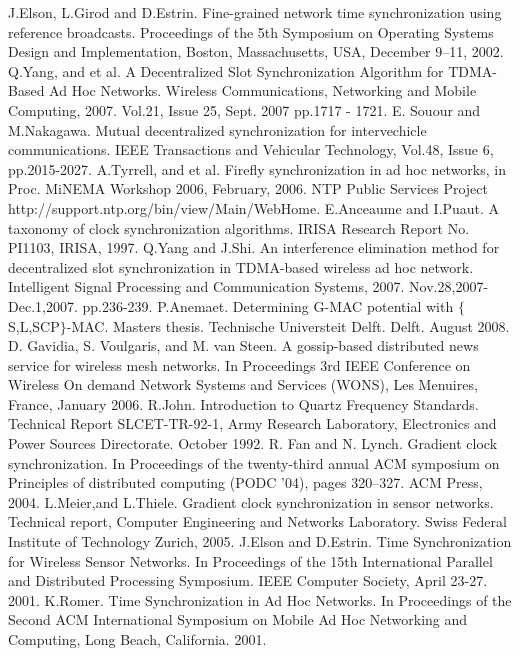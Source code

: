 \documentclass[a4paper,10pt]{report}
\begin{document}
\begin{thebibliography}{\textbf{References}}
J.Elson, L.Girod and D.Estrin. Fine-grained network time synchronization using reference broadcasts. Proceedings of the 5th Symposium on Operating Systems Design and Implementation, Boston, Massachusetts, USA, December 9–11, 2002.
Q.Yang, and et al. A Decentralized Slot Synchronization Algorithm for TDMA-Based Ad Hoc Networks. Wireless Communications, Networking and Mobile Computing, 2007. Vol.21, Issue 25, Sept. 2007 pp.1717 - 1721.
E. Souour and M.Nakagawa. Mutual decentralized synchronization for intervechicle communications. IEEE Transactions and Vehicular Technology, Vol.48, Issue 6, pp.2015-2027.
A.Tyrrell, and et al. Firefly synchronization in ad hoc networks, in Proc. MiNEMA Workshop 2006, February, 2006.
NTP Public Services Project http://support.ntp.org/bin/view/Main/WebHome.
E.Anceaume and I.Puaut. A taxonomy of clock synchronization algorithms. IRISA Research Report No. PI1103, IRISA, 1997.
Q.Yang and J.Shi. An interference elimination method for decentralized slot synchronization in TDMA-based wireless ad hoc network. Intelligent Signal Processing and Communication Systems, 2007. Nov.28,2007-Dec.1,2007. pp.236-239.
 P.Anemaet. Determining G-MAC potential with $\{$S,L,SCP$\}$-MAC. Masters thesis. Technische Universteit Delft. Delft. August 2008.
D. Gavidia, S. Voulgaris, and M. van Steen. A gossip-based distributed news service for wireless mesh networks. In Proceedings 3rd IEEE Conference on Wireless On demand Network Systems and Services (WONS), Les Menuires, France, January 2006.
R.John. Introduction to Quartz Frequency Standards. Technical Report SLCET-TR-92-1, Army Research Laboratory, Electronics and Power Sources Directorate. October 1992.
R. Fan and N. Lynch. Gradient clock synchronization. In Proceedings of the twenty-third annual ACM symposium on Principles of distributed computing (PODC ’04), pages 320–327. ACM Press, 2004.
L.Meier,and L.Thiele. Gradient clock synchronization in sensor networks. Technical report, Computer Engineering and Networks Laboratory. Swiss Federal Institute of Technology Zurich, 2005.
J.Elson and D.Estrin. Time Synchronization for Wireless Sensor Networks. In Proceedings of the 15th International Parallel and Distributed Processing Symposium. IEEE Computer Society, April 23-27. 2001.
K.Romer. Time Synchronization in Ad Hoc Networks. In Proceedings of the Second ACM International Symposium on Mobile Ad Hoc Networking and Computing, Long Beach, California. 2001.

\end{thebibliography}
\end{document}
